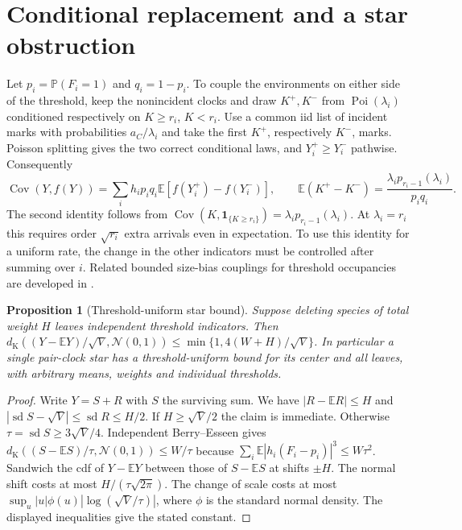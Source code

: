 \documentclass[11pt]{article}
\newtheorem{prop}[theorem]{Proposition}
\newcommand{\E}{\mathbb E}
\newcommand{\Prb}{\mathbb P}
\newcommand{\Cov}{\operatorname{Cov}}
\newcommand{\Poi}{\operatorname{Poi}}
\newcommand{\ind}{\mathbf1}
\newcommand{\dK}{d_{\mathrm K}}
\newcommand{\Nlaw}{\mathcal N(0,1)}
\newcommand{\sd}{\operatorname{sd}}
\numberwithin{equation}{section}
\begin{document}
\section{Conditional replacement and a star obstruction}
Let $p_i=\Prb(F_i=1)$ and $q_i=1-p_i$. To couple the environments on either side
of the threshold, keep the nonincident clocks and draw $K^+,K^-$ from
$\Poi(\lambda_i)$ conditioned respectively on $K\ge r_i$, $K<r_i$.
Use a common iid list of incident marks with probabilities $a_C/\lambda_i$
and take the first $K^+$, respectively $K^-$, marks. Poisson splitting
gives the two correct conditional laws, and $Y_i^+\ge Y_i^-$ pathwise.
Consequently
\[
 \Cov(Y,f(Y))=\sum_i h_ip_iq_i\E[f(Y_i^+)-f(Y_i^-)],\qquad
 \E(K^+-K^-)=\frac{\lambda_i p_{r_i-1}(\lambda_i)}{p_i q_i}.
\]
The second identity follows from $\Cov(K,\ind_{\{K\ge r_i\}})=\lambda_i p_{r_i-1}(\lambda_i)$.
At $\lambda_i=r_i$ this requires order $\sqrt{r_i}$ extra arrivals even in expectation.
To use this identity for a uniform rate, the change in the other indicators
must be controlled after summing over $i$. Related bounded size-bias couplings
for threshold occupancies are developed in \cite{BGI}.

\begin{prop}[Threshold-uniform star bound]\label{prop:star}
Suppose deleting species of total weight $H$ leaves independent threshold
indicators. Then $\dK((Y-\E Y)/\sqrt V,\Nlaw)\le
\min\{1,4(W+H)/\sqrt V\}$. In particular a single pair-clock star has a
threshold-uniform bound for its center and all leaves, with arbitrary means,
weights and individual thresholds.
\end{prop}
\begin{proof}
Write $Y=S+R$ with $S$ the surviving sum. We have $|R-\E R|\le H$ and
$|\sd S-\sqrt V|\le\sd R\le H/2$. If $H\ge\sqrt V/2$ the claim is immediate.
Otherwise $\tau=\sd S\ge3\sqrt V/4$.
Independent Berry--Esseen gives $\dK((S-\E S)/\tau,\Nlaw)\le W/\tau$
because $\sum_i\E|h_i(F_i-p_i)|^3\le W\tau^2$.
Sandwich the cdf of $Y-\E Y$ between those of $S-\E S$ at shifts $\pm H$.
The normal shift costs at most $H/(\tau\sqrt{2\pi})$.
The change of scale costs at most $\sup_u|u|\phi(u)|\log(\sqrt V/\tau)|$,
where $\phi$ is the standard normal density. The displayed inequalities give the stated constant.
\end{proof}
\end{document}
